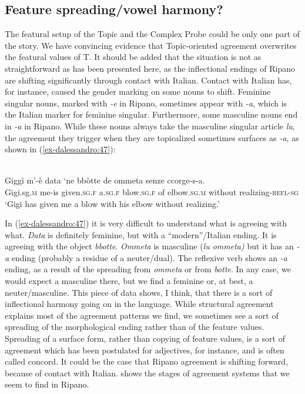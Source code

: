 \documentclass[output=paper
,modfonts
,nonflat]{langsci/langscibook}
\begin{document}
\subsection{Feature spreading/vowel harmony?}\label{sec-dalessandro:5.3}
The featural setup of the Topic and the Complex Probe could be only one part of the story. We have convincing evidence that Topic-oriented agreement overwrites the featural values of T. It should be added that the situation is not as straightforward as has been presented here, as the inflectional endings of Ripano are shifting significantly through contact with Italian.
Contact with Italian has, for instance, caused the gender marking on some nouns to shift. Feminine singular nouns, marked with \textit{-e} in Ripano, sometimes appear with \textit{-a}, which is the Italian marker for feminine singular. Furthermore, some masculine nouns end in \textit{-a} in Ripano. While these nouns always take the masculine singular article \textit{lu}, the agreement they trigger when they are topicalized sometimes surfaces as \textit{-a,}  as shown in (\ref{ex-dalessandro:47}):

\begin{exe}
	\ex \label{ex-dalessandro:47}\citet[113]{Rossi2008}\\
	\gll Giggì   m’-è   data     ‘ne   bbòtte     de   ommeta senze    ccorge-s-a.\\
	Gigi.sg.\textsc{m} me-is  given.\textsc{sg.f}  a.\textsc{sg.f} blow.\textsc{sg.f} of  elbow.\textsc{sg.m} without  realizing-\textsc{refl-sg}\\
	\glt `Gigi has given me a blow with his elbow without realizing.'
\end{exe}
In (\ref{ex-dalessandro:47}) it is very difficult to understand what is agreeing with what. \textit{Data} is definitely feminine, but with a “modern”/Italian ending. It is agreeing with the object \textit{bbotte}. \textit{Ommeta} is masculine (\textit{lu ommeta)} but it has an \textit{-a} ending (probably a residue of a neuter/dual). The reflexive verb shows an \textit{-a} ending, as a result of the spreading from \textit{ommeta} or from \textit{botte}. In any case, we would expect a masculine there, but we find a feminine or, at best, a neuter/masculine. This piece of data shows, I think, that there is a sort of inflectional harmony going on in the language. While structural agreement explains most of the agreement patterns we find, we sometimes see a sort of spreading of the morphological ending rather than of the feature values. 
Spreading of a surface form, rather than copying of feature values, is a sort of agreement which has been postulated for adjectives, for instance, and is often called concord. It could be the case that Ripano agreement is shifting forward, because of contact with Italian.
 shows the stages of agreement systems that we seem to find in Ripano.
\end{document}
